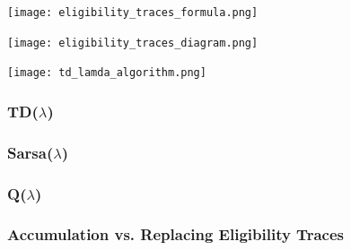 \texttt{[image: eligibility\_traces\_formula.png]}

\texttt{[image: eligibility\_traces\_diagram.png]}

\texttt{[image: td\_lamda\_algorithm.png]}

\subsubsection{TD($\lambda$)}
\subsubsection{Sarsa($\lambda$)}
\subsubsection{Q($\lambda$)}
\subsubsection{Accumulation vs. Replacing Eligibility Traces}
